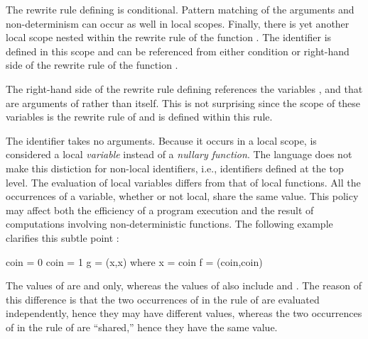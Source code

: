 The rewrite rule defining  is conditional.
Pattern matching of the arguments and non-determinism
can occur as well in local scopes.
Finally, there is yet another local scope nested
within the rewrite rule of the function .
The identifier  is defined in this scope
and can be referenced from either condition or right-hand side
of the rewrite rule of the function .

The right-hand side of the rewrite rule defining 
references the variables ,  and 
that are arguments of  rather than  itself.
This is not surprising since the scope of these variables
is the rewrite rule of  and 
is defined within this rule.

The identifier  takes no arguments.
Because it occurs in a local scope,
 is considered
a local \emph{variable}
instead of a \emph{nullary function}.
The language does not make this distiction for non-local
identifiers, i.e., identifiers defined at the top level.
The evaluation of local variables differs from that of local functions.
All the occurrences of a variable,
whether or not local, share the same value.
This policy may affect both the efficiency of a program execution
and the result of computations involving non-deterministic
functions.  The following example clarifies this subtle point
:
%
\begin{prog}
coin = 0
coin = 1
\medskip
g = (x,x) where x = coin
\medskip
f = (coin,coin)
\end{prog}
%
The values of  are  and  only,
whereas the values of  also include 
 and .
The reason of this difference
is that the two occurrences of  in the rule of 
are evaluated independently, hence they may have different values,
whereas the two occurrences of 
in the rule of  are ``shared,'' hence they have the same value.

